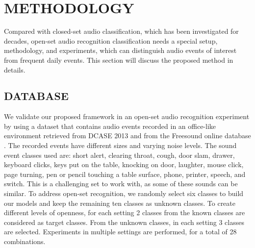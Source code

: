\documentclass{ieeeaccess}
\begin{document}
\section{METHODOLOGY} \label{sec:VII}
Compared with closed-set audio classification, which has been investigated for decades, open-set audio recognition classification needs a special setup, methodology, and experiments, which can distinguish audio events of interest from frequent daily events. This section will discuss the proposed method in details.
\subsection{DATABASE}
We validate our proposed framework in an open-set audio recognition experiment by using a dataset that contains audio events recorded in an office-like environment retrieved from DCASE 2013  \cite{34} and from the Freesound online database \cite{35}. The recorded events have different sizes and varying noise levels. The sound event classes used are: short alert, clearing throat, cough, door slam, drawer, keyboard clicks, keys put on the table, knocking on door, laughter, mouse click, page turning, pen or pencil touching a table surface, phone, printer, speech, and switch. This is a challenging set to work with, as some of these sounds can be similar. To address open-set recognition, we randomly select six classes to build our models and keep the remaining ten classes as unknown classes. To create different levels of openness, for each setting 2 classes from the known classes are considered as target classes. From the unknown classes, in each setting 3 classes are selected. Experiments in multiple settings are performed, for a total of 28 combinations.
\end{document}

